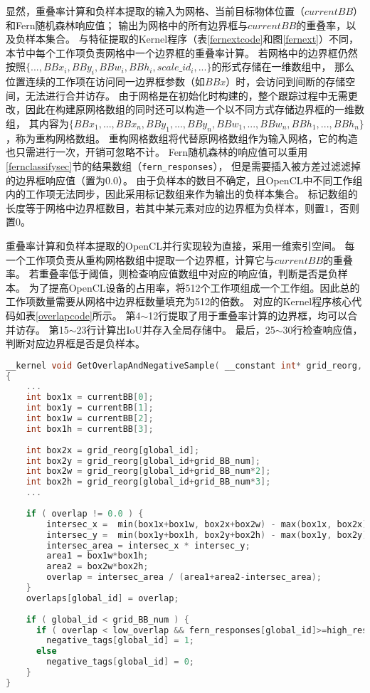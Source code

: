 显然，重叠率计算和负样本提取的输入为网格、当前目标物体位置（$currentBB$）和Fern随机森林响应值；
输出为网格中的所有边界框与$currentBB$的重叠率，以及负样本集合。
与特征提取的Kernel程序（表\ref{fernextcode}和图\ref{fernext}）不同，本节中每个工作项负责网格中一个边界框的重叠率计算。
若网格中的边界框仍然按照$\{ ..., BBx_i, BBy_i, BBw_i, BBh_i, scale\_id_i, ... \}$的形式存储在一维数组中，
那么位置连续的工作项在访问同一边界框参数（如$BBx$）时，会访问到间断的存储空间，无法进行合并访存。
由于网格是在初始化时构建的，整个跟踪过程中无需更改，因此在构建原网格数组的同时还可以构造一个以不同方式存储边界框的一维数组，
其内容为$\{BBx_1, ..., BBx_n, BBy_1, ..., BBy_n, BBw_1, ..., BBw_n, BBh_1, ..., BBh_n\}$，称为重构网格数组。
重构网格数组将代替原网格数组作为输入网格，它的构造也只需进行一次，开销可忽略不计。
Fern随机森林的响应值可以重用\ref{fernclassifysec}节的结果数组（\texttt{fern\_responses}），
但是需要插入被方差过滤滤掉的边界框响应值（置为$0.0$）。
由于负样本的数目不确定，且OpenCL中不同工作组内的工作项无法同步，因此采用标记数组来作为输出的负样本集合。
标记数组的长度等于网格中边界框数目，若其中某元素对应的边界框为负样本，则置1，否则置0。

重叠率计算和负样本提取的OpenCL并行实现较为直接，采用一维索引空间。
每一个工作项负责从重构网格数组中提取一个边界框，计算它与$currentBB$的重叠率。
若重叠率低于阈值，则检查响应值数组中对应的响应值，判断是否是负样本。
为了提高OpenCL设备的占用率，将512个工作项组成一个工作组。因此总的工作项数量需要从网格中边界框数量填充为512的倍数。
对应的Kernel程序核心代码如表\ref{overlapcode}所示。
第4$\sim$12行提取了用于重叠率计算的边界框，均可以合并访存。
第15$\sim$23行计算出IoU并存入全局存储中。
最后，25$\sim$30行检查响应值，判断对应边界框是否是负样本。

\begin{table}
\caption{重叠率计算和负样本提取的Kernel程序}
\label{overlapcode}
\begin{lstlisting}[language=C++, basicstyle=\ttfamily\footnotesize]    
__kernel void GetOverlapAndNegativeSample( __constant int* grid_reorg, __global int* currentBB,  __global float* fern_responses, __global float* overlaps, __global uchar* negative_tags )
{		
	...
	int box1x = currentBB[0];
	int box1y = currentBB[1];
	int box1w = currentBB[2];
	int box1h = currentBB[3];
	
	int box2x = grid_reorg[global_id];
	int box2y = grid_reorg[global_id+grid_BB_num];
	int box2w = grid_reorg[global_id+grid_BB_num*2];
	int box2h = grid_reorg[global_id+grid_BB_num*3];
	...
	
	if ( overlap != 0.0 ) {
	    intersec_x =  min(box1x+box1w, box2x+box2w) - max(box1x, box2x);
	    intersec_y =  min(box1y+box1h, box2y+box2h) - max(box1y, box2y);
	    intersec_area = intersec_x * intersec_y;
	    area1 = box1w*box1h;
	    area2 = box2w*box2h;
	    overlap = intersec_area / (area1+area2-intersec_area);
	}
	overlaps[global_id] = overlap;
	
	if ( global_id < grid_BB_num ) {
	  if ( overlap < low_overlap && fern_responses[global_id]>=high_response )
	    negative_tags[global_id] = 1;
	  else
	    negative_tags[global_id] = 0;
	}
}
\end{lstlisting}
\end{table}

